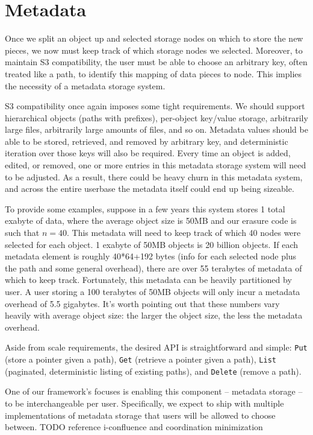 \documentclass[11pt,fleqn,openany]{book}
\newcommand{\x}[1]{{\tt #1}} \newcommand{\code}[1]{{\tt #1}}
\newcommand{\todo}[1]{{\color{red} TODO #1 }}
\begin{document}
\section{Metadata}

Once we split an object up and selected storage nodes on which to store the
new pieces, we now must keep track of which storage nodes we selected.
Moreover, to maintain S3 compatibility, the user must be able to choose an
arbitrary key, often treated like a path, to identify this mapping of data
pieces to node. This implies the necessity of a metadata storage system.

S3 compatibility once again imposes some tight requirements.
We should support
hierarchical objects (paths with prefixes), per-object key/value storage,
arbitrarily large files, arbitrarily large amounts of files, and so on.
Metadata values
should be able to be stored, retrieved, and removed by arbitrary key, and
deterministic iteration over those keys will also be required. Every time an
object is added, edited, or removed, one or more entries in this metadata
storage system will need to be adjusted. As a result, there could be heavy churn
in this metadata system, and across the entire userbase the metadata itself
could end up being sizeable.

To provide some examples, suppose in
a few years this system stores 1 total exabyte of data, where the average object
size is 50MB and our erasure code is such that $n=40$. This metadata will need
to keep track of which 40 nodes were selected for each object.
1 exabyte of 50MB objects is 20 billion objects. If
each metadata element is roughly 40*64+192 bytes (info for each selected node
plus the path and some general overhead), there are over 55 terabytes of
metadata of which to keep track.
Fortunately, this metadata can be heavily partitioned by user. A user storing a
100 terabytes of 50MB objects will only incur a metadata overhead of 5.5
gigabytes. It's worth pointing out that these numbers vary
heavily with average object size: the larger the object size, the less the
metadata overhead.

Aside from scale requirements, the desired API is straightforward and
simple: \x{Put} (store a pointer given a path), \x{Get} (retrieve a pointer
given a path),
\x{List} (paginated, deterministic listing of existing paths), and \x{Delete}
(remove a path).

One of our framework's focuses is enabling this component -- metadata
storage -- to be interchangeable per user. Specifically, we expect to ship with
multiple implementations of metadata storage that users will be allowed to
choose between. \todo{reference i-confluence and coordination minimization}
\end{document}
